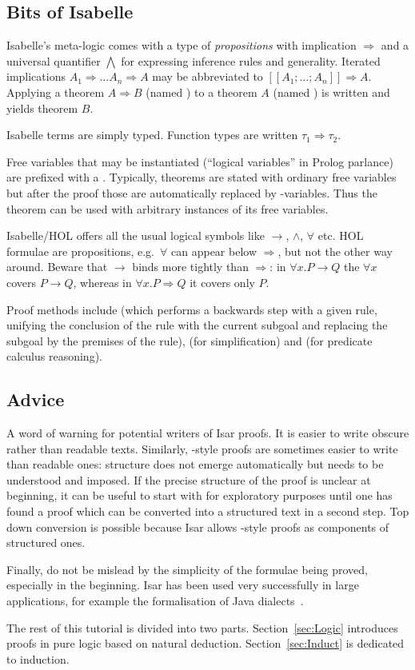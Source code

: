 \subsection{Bits of Isabelle}

Isabelle's meta-logic comes with a type of \emph{propositions} with
implication $\Longrightarrow$ and a universal quantifier $\bigwedge$ for expressing
inference rules and generality.  Iterated implications $A_1 \Longrightarrow \dots
A_n \Longrightarrow A$ may be abbreviated to $[\![ A_1; \dots; A_n ]\!] \Longrightarrow A$.
Applying a theorem $A \Longrightarrow B$ (named ) to a theorem $A$ (named
) is written  and yields theorem $B$.

Isabelle terms are simply typed. Function types are
written $\tau_1 \Rightarrow \tau_2$.

Free variables that may be instantiated (``logical variables'' in Prolog
parlance) are prefixed with a . Typically, theorems are stated with
ordinary free variables but after the proof those are automatically replaced
by -variables. Thus the theorem can be used with arbitrary instances
of its free variables.

Isabelle/HOL offers all the usual logical symbols like $\longrightarrow$, $\land$,
$\forall$ etc. HOL formulae are propositions, e.g.\ $\forall$ can appear below
$\Longrightarrow$, but not the other way around. Beware that $\longrightarrow$ binds more
tightly than $\Longrightarrow$: in $\forall x. P \longrightarrow Q$ the $\forall x$ covers $P \longrightarrow Q$, whereas
in $\forall x. P \Longrightarrow Q$ it covers only $P$.

Proof methods include  (which performs a backwards
step with a given rule, unifying the conclusion of the rule with the
current subgoal and replacing the subgoal by the premises of the
rule),  (for simplification) and  (for predicate
calculus reasoning).

\subsection{Advice}

A word of warning for potential writers of Isar proofs.  It
is easier to write obscure rather than readable texts.  Similarly,
-style proofs are sometimes easier to write than readable
ones: structure does not emerge automatically but needs to be
understood and imposed. If the precise structure of the proof is
unclear at beginning, it can be useful to start with  for
exploratory purposes until one has found a proof which can be
converted into a structured text in a second step. Top down conversion
is possible because Isar allows -style proofs as components
of structured ones.

Finally, do not be mislead by the simplicity of the formulae being proved,
especially in the beginning. Isar has been used very successfully in
large applications, for example the formalisation of Java
dialects~\cite{KleinN-TOPLAS}.
\medskip

The rest of this tutorial is divided into two parts.
Section~\ref{sec:Logic} introduces proofs in pure logic based on
natural deduction. Section~\ref{sec:Induct} is dedicated to induction.

